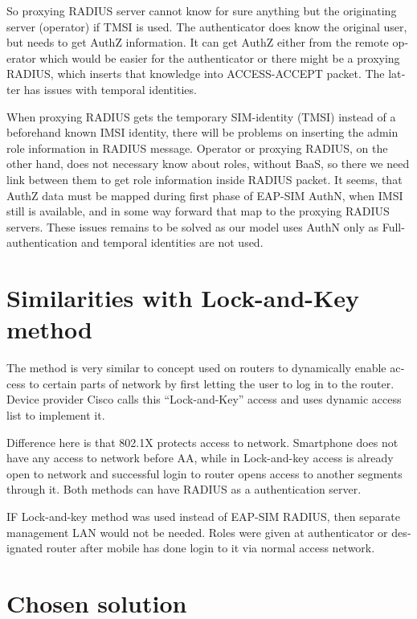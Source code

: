 \documentclass[12pt,a4paper,english]{tutthesis}
\begin{document}
\begin{otherlanguage}{english}
So proxying RADIUS server cannot know for sure anything but the
originating server (operator) if TMSI is used. The authenticator does
know the original user, but needs to get AuthZ information. It can get
AuthZ either from the remote operator which would be easier for the
authenticator or there might be a proxying RADIUS, which inserts that
knowledge into ACCESS-ACCEPT packet. The latter has issues with
temporal identities. 






When proxying RADIUS gets the temporary SIM-identity (TMSI) instead of
a beforehand known IMSI identity, there will be problems on inserting
the admin role information in RADIUS message.
Operator or proxying RADIUS, on the other hand, does not necessary
know about roles, without BaaS, so there we need link between them to
get role information inside RADIUS packet.
It seems, that AuthZ data must be mapped during first phase of
EAP-SIM AuthN, when IMSI still is available, and in some way forward
that map to the proxying RADIUS servers.
These issues remains to be solved as our model uses AuthN only as  
Full-authentication and temporal identities are not used.

\section{Similarities with Lock-and-Key method}
\label{sec-4-8}
The method is very similar to concept used on routers to dynamically enable
access to certain parts of network by first letting the user to log in
to the router.  
Device provider Cisco calls this ``Lock-and-Key'' access
and uses dynamic access list to implement it. \cite[p.117]{lockandkeybook}

Difference here is that 802.1X protects access to network. Smartphone
does not have any access to network before AA, while in Lock-and-key
access is already open to network and successful login to router  opens
access to another segments through it.
Both methods can have RADIUS as a authentication server.

IF Lock-and-key method was used instead of EAP-SIM RADIUS, then
separate management LAN would not be needed. Roles were given at
authenticator or designated router after mobile has done login to it
via normal access network.
\section{Chosen solution}
\label{sec-4-9}


\end{otherlanguage}
\end{document}

